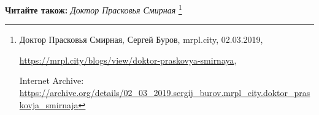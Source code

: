  
 
 
 
 

\textbf{Читайте також:} \emph{Доктор Прасковья Смирная}%
\footnote{Доктор Прасковья Смирная, Сергей Буров, mrpl.city, 02.03.2019, \par
\url{https://mrpl.city/blogs/view/doktor-praskovya-smirnaya}, \par%
Internet Archive: \url{https://archive.org/details/02_03_2019.sergij_burov.mrpl_city.doktor_praskovja_smirnaja}
} 
